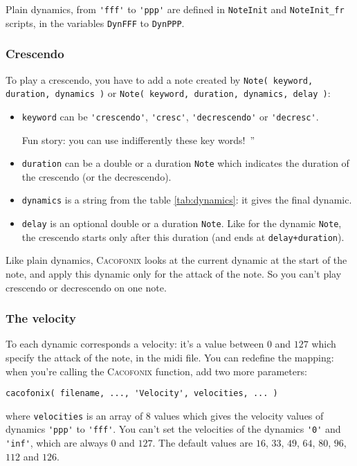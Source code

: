 \documentclass{article}
\newcommand{\cacofonix}{\textsc{Cacofonix}\xspace}
\newcommand{\note}{\lstinline!Note!\xspace}
\newenvironment{meenv}{ \par \noindent \makebox[6em][r]{ \textcolor{mecolor}{Me}: `` --~}}{~''}
\newcommand{\me}[1]{\begin{meenv}#1\end{meenv}}
\begin{document}
Plain dynamics, from \lstinline!'fff'! to \lstinline!'ppp'! are defined in \lstinline!NoteInit! and \lstinline!NoteInit_fr! scripts, in the variables \lstinline!DynFFF! to \lstinline!DynPPP!.

\subsubsection{Crescendo}
\label{sec:Crescendo}

To play a crescendo, you have to add a note created by \lstinline!Note( keyword, duration, dynamics )! or \lstinline!Note( keyword, duration, dynamics, delay )!:
\begin{itemize}
	\item \lstinline!keyword! can be \lstinline!'crescendo'!, \lstinline!'cresc'!, \lstinline!'decrescendo'! or \lstinline!'decresc'!.
		\me{Fun story: you can use indifferently these key words!}%
	\item \lstinline!duration! can be a double or a duration \note which indicates the duration of the crescendo (or the decrescendo).
	\item \lstinline!dynamics! is a string from the table \ref{tab:dynamics}: it gives the final dynamic.
	\item \lstinline!delay! is an optional double or a duration \note. Like for the dynamic \note, the crescendo starts only after this duration (and ends at \lstinline!delay+duration!).
\end{itemize}

Like plain dynamics, \cacofonix looks at the current dynamic at the start of the note, and apply this dynamic only for the attack of the note. So you can't play crescendo or decrescendo on one note.

\subsubsection{The velocity}
\label{sec:Velocity}

To each dynamic corresponds a velocity: it's a value between $0$ and $127$ which specify the attack of the note, in the midi file. You can redefine the mapping: when you're calling the \cacofonix function, add two more parameters:
\begin{lstlisting}
cacofonix( filename, ..., 'Velocity', velocities, ... )
\end{lstlisting}
where \lstinline!velocities! is an array of $8$ values which gives the velocity values of dynamics \lstinline!'ppp'! to \lstinline!'fff'!. You can't set the velocities of the dynamics \lstinline!'0'! and \lstinline!'inf'!, which are always $0$ and $127$. The default values are $16$, $33$, $49$, $64$, $80$, $96$, $112$ and $126$.
\end{document}
